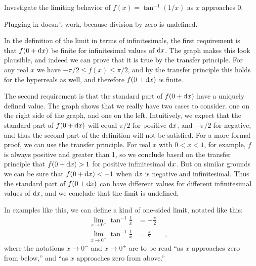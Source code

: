 
\begin{eg}\label{eg:limit-two-sides}
\egquestion Investigate the limiting behavior of $f(x)=\tan^{-1}(1/x)$ as $x$ approaches 0.

\eganswer Plugging in doesn't work, because division by zero is undefined.

In the definition of the limit in terms of infinitesimals, the first requirement is that $f(0+\textup{d} x)$ be
finite for infinitesimal values of $\textup{d} x$. The graph makes this look plausible, and indeed we can prove that
it is true by the transfer principle. For any real $x$ we have $-\pi/2 \le f(x) \le \pi/2$, and
by the transfer principle this holds for the hyperreals as well, and therefore $f(0+\textup{d} x)$ is finite.

The second requirement is that the standard part of $f(0+\textup{d} x)$ have a uniquely defined value.
The graph shows that we really have two cases to consider, one on the right side of the graph, and one on the left.
Intuitively, we expect that the standard part of $f(0+\textup{d} x)$ will equal $\pi/2$ for positive $\textup{d} x$, and
$-\pi/2$ for negative, and thus the second part of the definition will not be satisfied. For a more formal proof,
we can use the transfer principle.
For real $x$ with $0<x<1$, for example, $f$ is always positive and greater than 1, so we conclude based on the transfer principle
that $f(0+\textup{d} x)>1$ for positive infinitesimal $\textup{d} x$. But on similar grounds we can be sure that  $f(0+\textup{d} x)<-1$
when $\textup{d} x$ is negative and infinitesimal. Thus the standard part of $f(0+\textup{d} x)$ can have different values for
different infinitesimal values of $\textup{d} x$, and we conclude that the limit is undefined.

In examples like this, we can define a kind of one-sided limit, notated like this:
\begin{align*}
  \lim_{x\rightarrow 0^{-}} \tan^{-1}\frac{1}{x} &= -\frac{\pi}{2} \\
  \lim_{x\rightarrow 0^{+}} \tan^{-1}\frac{1}{x} &= \frac{\pi}{2} \qquad ,
\end{align*}
where the notations $x\rightarrow 0^{-}$ and $x\rightarrow 0^{+}$ are to be read ``as $x$ approaches zero from
below,'' and ``as $x$ approaches zero from above.''
\end{eg}

